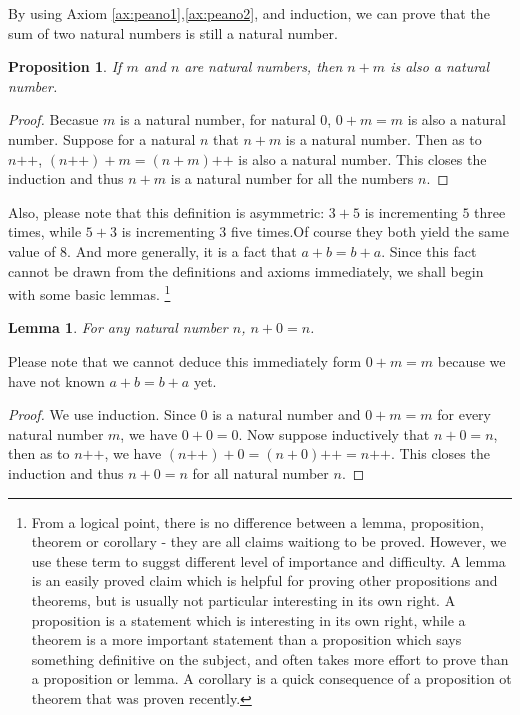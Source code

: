\documentclass[a4paper]{book}
\newtheorem*{proof}{\textit{Proof.}}
\newtheorem{lemma}{Lemma}[section]
\newtheorem{proposition}{Proposition}[section]
\begin{document}
			By using Axiom \ref{ax:peano1},\ref{ax:peano2}, and induction, we can prove that the sum of two natural numbers is still a natural number. 
			\begin{proposition}
				If $m$ and $n$ are natural numbers, then $n+m$ is also a natural number.
			\end{proposition}
			\begin{proof}
				Becasue $m$ is a natural number, for natural $0$, $0+m=m$ is also a natural number. Suppose for a natural $n$ that $n+m$ is a natural number. Then as to $n\texttt{++}$, $(n\texttt{++})+m = (n+m)\texttt{++}$ is also a natural number. This closes the induction and thus $n+m$ is a natural number for all the numbers $n$.
			\end{proof}
			Also, please note that this definition is asymmetric: $3+5$ is incrementing $5$ three times, while $5+3$ is incrementing $3$ five times.Of course they both yield the same value of $8$. And more generally, it is a fact that $a+b=b+a$. Since this fact cannot be drawn from the definitions and axioms immediately, we shall begin with some basic lemmas.
			\footnote{From a logical point, there is no difference between a lemma, proposition, theorem or corollary - they are all claims waitiong to be proved. However, we use these term to suggst different level of importance and difficulty. A lemma is an easily proved claim which is helpful for proving other propositions and theorems, but is usually not particular interesting in its own right. A proposition is a statement which is interesting in its own right, while a theorem is a more important statement than a proposition which says something definitive on the subject, and often takes more effort to prove than a proposition or lemma. A corollary is a quick consequence of a proposition ot theorem that was proven recently.}\\
			\begin{lemma}
				\label{lam:n+0=n}
				For any natural number $n$, $n+0=n$.
			\end{lemma}
			Please note that we cannot deduce this immediately form $0+m=m$ because we have not known $a+b=b+a$ yet.
			\begin{proof}
				We use induction. Since $0$ is a natural number and $0+m=m$ for every natural number $m$, we have $0+0=0$. Now suppose inductively that $n+0=n$, then as to $n\texttt{++}$, we have $(n\texttt{++})+0=(n+0)\texttt{++}=n\texttt{++}$. This closes the induction and thus $n+0=n$ for all natural number $n$.
			\end{proof}
\end{document}
